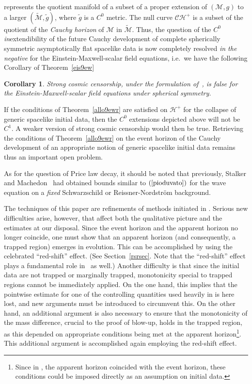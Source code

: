 \documentclass{article}
\newtheorem{corollary}[theorem]{Corollary}
\begin{document}
represents the quotient manifold of a subset of a 
proper extension of $(\mathcal{M},g)$
to a larger $(\tilde{\mathcal{M}},\tilde{g})$, where $\tilde{g}$ is a
$C^0$ metric. The null curve $\mathcal{CH}^+$ is a 
subset of the quotient of the \emph{Cauchy
horizon} of $\mathcal{M}$ in $\tilde{\mathcal{M}}$. 
Thus, the question of the $C^0$ \emph{in}extendibility 
of the future Cauchy development of complete spherically symmetric
asymptotically
flat spacelike data is now completely resolved \emph{in the negative}
for the Einstein-Maxwell-scalar
field equations, i.e.~we have the following
Corollary of Theorem~\ref{eis9ew}
\begin{corollary}
Strong cosmic censorship, under the formulation 
of~\cite{chr:givp},
is false for the Einstein-Maxwell-scalar field equations under
spherical symmetry.
\end{corollary}

If the conditions of Theorem~\ref{allo9ewr} are satisfied on $\mathcal{H}^+$
for the collapse of generic spacelike initial data, then the $C^0$
extensions depicted above will not be $C^1$. A weaker version of
strong cosmic censorship would then be true. Retrieving the conditions
of Theorem~\ref{allo9ewr} on the event horizon of
the Cauchy development of an appropriate notion of
generic spacelike initial data remains thus an important open problem.

As for the question of Price law decay,
it should be noted that 
previously, Stalker and Machedon~\cite{st:pc} had obtained
bounds similar to $(\ref{pioduvato})$
for the wave equation on a \emph{fixed} Schwarzschild
or Reissner-Nordstr\"om background.

The techniques of this paper are refinements of methods
initiated in \cite{md:si}. Serious new difficulties arise, however, 
that affect both the qualitative picture and the estimates at 
our disposal. Since the event horizon and the apparent horizon no 
longer coincide, 
one must show that an apparent horizon (and consequently, a trapped
region) emerges in evolution. This can be accomplished by using 
the celebrated ``red-shift'' effect.
(See Section~\ref{rsrsec}. Note that the ``red-shift'' effect plays a fundamental
role in~\cite{mi:mazi} as well.)
Another difficulty is that since 
the initial data are not trapped or marginally trapped, monotonicity
special to trapped regions cannot be immediately applied. 
On the one hand, this implies that the pointwise estimate for 
one of the controlling quantities used heavily in \cite{md:si} is here lost,
and new arguments must be introduced to circumvent this. 
On the other hand, an additional argument is also necessary to ensure
that the monotonicity of the mass difference, crucial
to the proof of blow-up, holds in the trapped
region, as this depended on appropriate conditions being met
at the apparent horizon\footnote{Since in \cite{md:si}, the apparent
horizon coincided with the event horizon, these conditions could be
imposed directly as an assumption on initial data.}. 
This additional argument is accomplished again employing the
red-shift effect.
\end{document}
